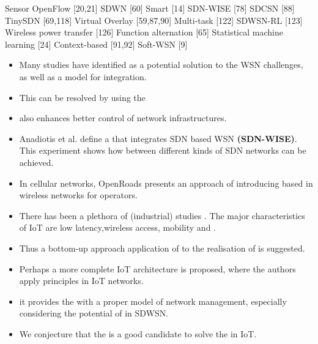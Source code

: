 Sensor OpenFlow [20,21]
SDWN [60]
Smart [14]
SDN-WISE [78]
SDCSN [88]
TinySDN [69,118]
Virtual Overlay [59,87,90]
Multi-task [122]
SDWSN-RL [123]
Wireless power transfer [126]
Function alternation [65]
Statistical machine learning [24]
Context-based [91,92]
Soft-WSN [9]

\begin{itemize}
	\item[\cite{qin_software_2014}] Many studies have identified  as a potential solution to the WSN challenges,
	as well as a model for  integration.
	\item[\cite{qin_software_2014}] This  can be resolved by using the 
	\item[\cite{kobo_survey_2017}]  also enhances better control of  network infrastructures.
	\item[\cite{kobo_survey_2017}] Anadiotis et al. define a  that integrates SDN based WSN \textbf{(SDN-WISE)}.
		This experiment shows how  between different kinds of SDN networks can be achieved.
	\item[\cite{kobo_survey_2017}] In cellular networks,
		OpenRoads presents an approach of introducing  based  in wireless networks for operators.
	\item[\cite{ndiaye_software_2017}] There has been a plethora of (industrial) studies .
			The major characteristics of IoT are low latency,wireless access, mobility and .
	\item[\cite{ndiaye_software_2017}] Thus a bottom-up approach application of  to the realisation of  is suggested.
	\item[\cite{ndiaye_software_2017}] Perhaps a more complete IoT architecture is proposed,
			where the authors apply  principles in IoT  networks.
	\item[\cite{bera_softwaredefined_2017}] it provides the  with a proper model of network management,
			especially considering the potential of  in SDWSN.
	\item[\cite{bera_softwaredefined_2017}] We conjecture that the  is a good candidate to solve the  in IoT.
\end{itemize}


